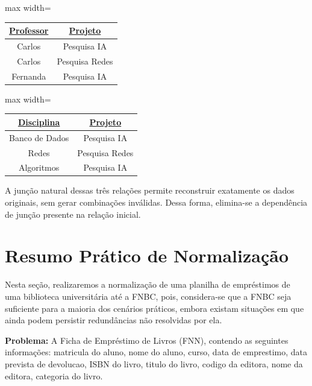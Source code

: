 \begin{tcolorbox}[breakable, colback=blue!5,colframe=blue!40!black,title=Situação exemplo]
    \begin{adjustbox}{max width=\textwidth}
    \begin{tabular}{|c|c|}
    \hline
    \textbf{\underline{Professor}} & \textbf{\underline{Projeto}} \\ \hline
    Carlos & Pesquisa IA \\ \hline
    Carlos & Pesquisa Redes \\ \hline
    Fernanda & Pesquisa IA \\ \hline
    \end{tabular}
\end{adjustbox}
    \vspace{0.3cm}

    \begin{adjustbox}{max width=\textwidth}
    \begin{tabular}{|c|c|}
    \hline
    \textbf{\underline{Disciplina}} & \textbf{\underline{Projeto}} \\ \hline
    Banco de Dados & Pesquisa IA \\ \hline
    Redes & Pesquisa Redes \\ \hline
    Algoritmos & Pesquisa IA \\ \hline
    \end{tabular}
\end{adjustbox}
    \vspace{0.4cm}

    \justify

    A junção natural dessas três relações permite reconstruir exatamente os dados originais, sem gerar combinações inválidas. Dessa forma, elimina-se a dependência de junção presente na relação inicial.

\end{tcolorbox}

\section{Resumo Prático de Normalização}

Nesta seção, realizaremos a normalização de uma planilha de empréstimos de uma biblioteca universitária até a FNBC, pois, considera-se que a FNBC seja suficiente para a maioria dos cenários práticos, embora existam situações em que ainda podem persistir redundâncias não resolvidas por ela.

\vspace{0.4cm}
\textbf{Problema:} A Ficha de Empréstimo de Livros (FNN), contendo as seguintes informações: matricula do aluno, nome do aluno, curso, data de emprestimo, data prevista de devolucao, ISBN do livro, titulo do livro, codigo da editora, nome da editora, categoria do livro.

